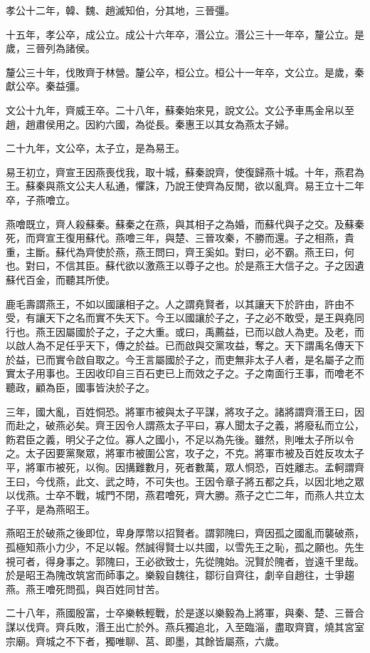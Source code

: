 孝公十二年，韓、魏、趙滅知伯，分其地，三晉彊。

十五年，孝公卒，成公立。成公十六年卒，湣公立。湣公三十一年卒，釐公立。是歲，三晉列為諸侯。

釐公三十年，伐敗齊于林營。釐公卒，桓公立。桓公十一年卒，文公立。是歲，秦獻公卒。秦益彊。

文公十九年，齊威王卒。二十八年，蘇秦始來見，說文公。文公予車馬金帛以至趙，趙肅侯用之。因約六國，為從長。秦惠王以其女為燕太子婦。

二十九年，文公卒，太子立，是為易王。

易王初立，齊宣王因燕喪伐我，取十城，蘇秦說齊，使復歸燕十城。十年，燕君為王。蘇秦與燕文公夫人私通，懼誅，乃說王使齊為反閒，欲以亂齊。易王立十二年卒，子燕噲立。

燕噲既立，齊人殺蘇秦。蘇秦之在燕，與其相子之為婚，而蘇代與子之交。及蘇秦死，而齊宣王復用蘇代。燕噲三年，與楚、三晉攻秦，不勝而還。子之相燕，貴重，主斷。蘇代為齊使於燕，燕王問曰，齊王奚如。對曰，必不霸。燕王曰，何也。對曰，不信其臣。蘇代欲以激燕王以尊子之也。於是燕王大信子之。子之因遺蘇代百金，而聽其所使。

鹿毛壽謂燕王，不如以國讓相子之。人之謂堯賢者，以其讓天下於許由，許由不受，有讓天下之名而實不失天下。今王以國讓於子之，子之必不敢受，是王與堯同行也。燕王因屬國於子之，子之大重。或曰，禹薦益，已而以啟人為吏。及老，而以啟人為不足任乎天下，傳之於益。已而啟與交黨攻益，奪之。天下謂禹名傳天下於益，已而實令啟自取之。今王言屬國於子之，而吏無非太子人者，是名屬子之而實太子用事也。王因收印自三百石吏已上而效之子之。子之南面行王事，而噲老不聽政，顧為臣，國事皆決於子之。

三年，國大亂，百姓恫恐。將軍市被與太子平謀，將攻子之。諸將謂齊湣王曰，因而赴之，破燕必矣。齊王因令人謂燕太子平曰，寡人聞太子之義，將廢私而立公，飭君臣之義，明父子之位。寡人之國小，不足以為先後。雖然，則唯太子所以令之。太子因要黨聚眾，將軍市被圍公宮，攻子之，不克。將軍市被及百姓反攻太子平，將軍市被死，以徇。因搆難數月，死者數萬，眾人恫恐，百姓離志。孟軻謂齊王曰，今伐燕，此文、武之時，不可失也。王因令章子將五都之兵，以因北地之眾以伐燕。士卒不戰，城門不閉，燕君噲死，齊大勝。燕子之亡二年，而燕人共立太子平，是為燕昭王。

燕昭王於破燕之後即位，卑身厚幣以招賢者。謂郭隗曰，齊因孤之國亂而襲破燕，孤極知燕小力少，不足以報。然誠得賢士以共國，以雪先王之恥，孤之願也。先生視可者，得身事之。郭隗曰，王必欲致士，先從隗始。況賢於隗者，豈遠千里哉。於是昭王為隗改筑宮而師事之。樂毅自魏往，鄒衍自齊往，劇辛自趙往，士爭趨燕。燕王噲死問孤，與百姓同甘苦。

二十八年，燕國殷富，士卒樂軼輕戰，於是遂以樂毅為上將軍，與秦、楚、三晉合謀以伐齊。齊兵敗，湣王出亡於外。燕兵獨追北，入至臨淄，盡取齊寶，燒其宮室宗廟。齊城之不下者，獨唯聊、莒、即墨，其餘皆屬燕，六歲。

